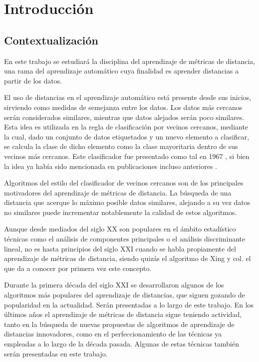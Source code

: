 \chapter{Introducción}

\section{Contextualización}

En este trabajo se estudiará la disciplina del aprendizaje de métricas de distancia, una rama del aprendizaje automático cuya finalidad es aprender distancias a partir de los datos.

El uso de distancias en el aprendizaje automático está presente desde sus inicios, sirviendo como medidas de semejanza entre los datos. Los datos más cercanos serán considerados similares, mientras que datos alejados serán poco similares. Esta idea es utilizada en la regla de clasificación por vecinos cercanos, mediante la cual, dado un conjunto de datos etiquetados y un nuevo elemento a clasificar, se calcula la clase de dicho elemento como la clase mayoritaria dentro de sus vecinos más cercanos. Este clasificador fue presentado como tal en 1967 \cite{cover1967nearest}, si bien la idea ya había sido mencionada en publicaciones incluso anteriores \cite{sebestyen1962decision,nilsson1965learning}.

Algoritmos del estilo del clasificador de vecinos cercanos son de los principales motivadores del aprendizaje de métricas de distancia. La búsqueda de una distancia que acerque lo máximo posible datos similares, alejando a su vez datos no similares puede incrementar notablemente la calidad de estos algoritmos. 

Aunque desde mediados del siglo XX son populares en el ámbito estadístico técnicas como el análisis de componentes principales o el análisis discriminante lineal, no es hasta principios del siglo XXI cuando se habla propiamente del aprendizaje de métricas de distancia, siendo quizás el algoritmo de Xing y col. \cite{lsi} el que da a conocer por primera vez este concepto.

Durante la primera década del siglo XXI se desarrollaron algunos de los algoritmos más populares del aprendizaje de distancias, que siguen gozando de popularidad en la actualidad. Serán presentadas a lo largo de este trabajo. En los últimos años el aprendizaje de métricas de distancia sigue teniendo actividad, tanto en la búsqueda de nuevas propuestas de algoritmos de aprendizaje de distancias innovadores, como en el perfeccionamiento de las técnicas ya empleadas a lo largo de la década pasada. Algunas de estas técnicas también serán presentadas en este trabajo.

